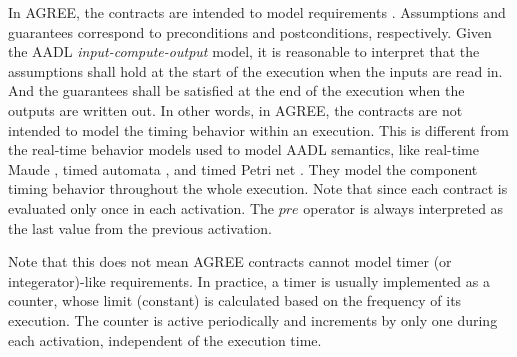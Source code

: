 
%

In AGREE, the contracts are intended to model requirements \cite{AGREE2}. Assumptions and guarantees correspond to preconditions and postconditions, respectively. Given the AADL \emph{input-compute-output} model, it is reasonable to interpret that the assumptions shall hold at the start of the execution when the inputs are read in. And the guarantees shall be satisfied at the end of the execution when the outputs are written out. In other words, in AGREE, the contracts are not intended to model the timing behavior within an execution. This is different from the real-time behavior models used to model AADL semantics, like real-time Maude \cite{maude}, timed automata \cite{behaviorannex}, and timed Petri net \cite{tpn}. They model the component timing behavior throughout the whole execution. Note that since each contract is evaluated only once in each activation. The $pre$ operator is always interpreted as the last value from the previous activation.

Note that this does not mean AGREE contracts cannot model timer (or integerator)-like requirements. In practice, a timer is usually implemented as a counter, whose limit (constant) is calculated based on the frequency of its execution. The counter is active periodically and increments by only one during each activation, independent of the execution time. 

